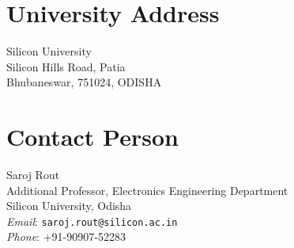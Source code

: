 \documentclass[12pt]{article}
\begin{document}
\section{University Address}
Silicon University \\
Silicon Hills Road, Patia \\
Bhubaneswar, 751024, ODISHA

\section{Contact Person}

Saroj Rout \\
Additional Professor, Electronics Engineering Department \\
Silicon University, Odisha \\
\textit{Email}: \texttt{saroj.rout@silicon.ac.in} \\
\textit{Phone}: +91-90907-52283 \\




\end{document}
